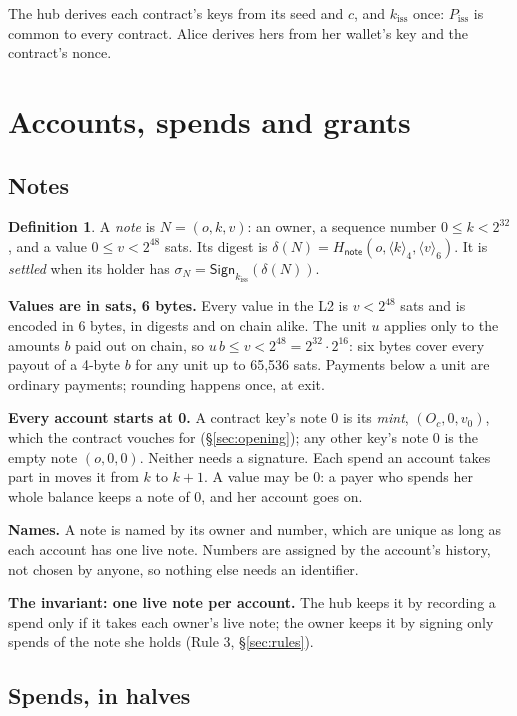 \documentclass[11pt]{article}
\theoremstyle{plain}
\theoremstyle{definition}
\newtheorem{definition}{Definition}
\newcommand{\be}[2]{\langle #1\rangle_{#2}}
\newcommand{\Ht}[1]{H_{\textsf{#1}}}
\newcommand{\Sign}{\mathsf{Sign}}
\newcommand{\kiss}{k_{\mathrm{iss}}}
\newcommand{\Piss}{P_{\mathrm{iss}}}
\newcommand{\Oc}{O_c}
\begin{document}
The hub derives each contract's keys from its seed and $c$, and $\kiss$
once: $\Piss$ is common to every contract. Alice derives hers from her
wallet's key and the contract's nonce.

\section{Accounts, spends and grants}

\subsection{Notes}\label{sec:notes}

\begin{definition}
A \emph{note} is $N = (o, k, v)$: an owner, a sequence number $0 \le k <
2^{32}$, and a value $0 \le v < 2^{48}$ sats. Its digest is $\delta(N) =
\Ht{note}(o, \be{k}{4}, \be{v}{6})$. It is \emph{settled} when its
holder has $\sigma_N = \Sign_{\kiss}(\delta(N))$.
\end{definition}

\textbf{Values are in sats, 6 bytes.} Every value in the L2 is $v <
2^{48}$ sats and is encoded in 6 bytes, in digests and on chain alike.
The unit $u$ applies only to the amounts $b$ paid out on chain, so
$u\,b \le v < 2^{48} = 2^{32} \cdot 2^{16}$: six bytes cover every
payout of a 4-byte $b$ for any unit up to 65,536 sats. Payments below a
unit are ordinary payments; rounding happens once, at exit.

\textbf{Every account starts at 0.} A contract key's note 0 is its
\emph{mint}, $(\Oc, 0, v_0)$, which the contract vouches for
(\S\ref{sec:opening}); any other key's note 0 is the empty note $(o, 0,
0)$. Neither needs a signature. Each spend an account takes part in
moves it from $k$ to $k + 1$. A value may be 0: a payer who spends her
whole balance keeps a note of 0, and her account goes on.

\textbf{Names.} A note is named by its owner and number, which are
unique as long as each account has one live note. Numbers are assigned
by the account's history, not chosen by anyone, so nothing else needs
an identifier.

\textbf{The invariant: one live note per account.} The hub keeps it by
recording a spend only if it takes each owner's live note; the owner
keeps it by signing only spends of the note she holds (Rule 3,
\S\ref{sec:rules}).

\subsection{Spends, in halves}\label{sec:spend}
\end{document}
